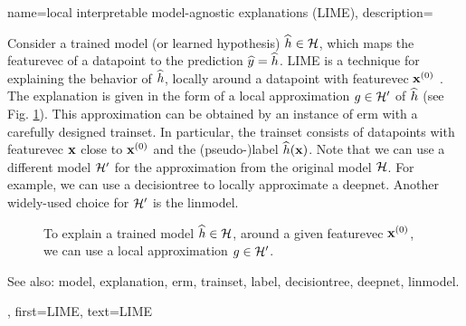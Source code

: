 {name={local interpretable model-agnostic explanations (LIME)},
	description={Consider 
		a trained \gls{model} (or learned \gls{hypothesis}) $\widehat{h} \in \mathcal{H}$, 
		which maps the \gls{featurevec} of a \gls{datapoint} to the \gls{prediction} $\widehat{y}= \widehat{h}$. 
		LIME is a technique for explaining the behavior of $\widehat{h}$, locally around a \gls{datapoint} with \gls{featurevec} ${\bf x}^{(0)}$ \cite{Ribeiro2016}. 
		The \gls{explanation} is given in the form of a local approximation $g \in \mathcal{H}'$ of $\widehat{h}$ 
		(see Fig. \ref{fig_lime_dict}). This approximation can be obtained by an instance of \gls{erm} 
		with a carefully designed \gls{trainset}. In particular, the \gls{trainset} consists of \glspl{datapoint} with 
		\gls{featurevec} ${\bf x}$ close to ${\bf x}^{(0)}$ and the (pseudo-)\gls{label} $\widehat{h}({\bf x})$. 
		Note that we can use a different \gls{model} $\mathcal{H}'$ for the approximation from 
		the original \gls{model} $\mathcal{H}$. For example, we can use a \gls{decisiontree} 
		to locally approximate a \gls{deepnet}. Another widely-used choice for $\mathcal{H}'$ is 
		the \gls{linmodel}. 
		\begin{figure}[H]
		\begin{center}
		\end{center}
		\caption{To explain a trained \gls{model} $\widehat{h} \in \mathcal{H}$, around a 
		given \gls{featurevec} ${\bf x}^{(0)}$, we can use a local approximation $g \in \mathcal{H}'$. }
		\label{fig_lime_dict}
		\end{figure}
		See also: \gls{model}, \gls{explanation}, \gls{erm}, \gls{trainset}, \gls{label}, \gls{decisiontree}, \gls{deepnet}, \gls{linmodel}.},
	first={LIME},
	text={LIME}
}



